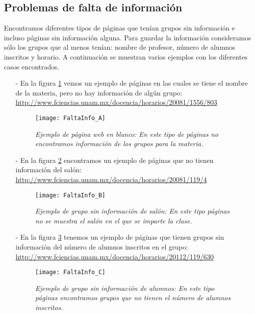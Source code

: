 \subsection{Problemas de falta de información}

Encontramos diferentes tipos de páginas que tenían grupos sin información e incluso páginas sin información alguna. Para guardar la información consideramos sólo los grupos que al menos tenían: nombre de profesor, número de alumnos inscritos y horario. A continuación se muestran varios ejemplos con los diferentes casos encontrados. %


\begin{itemize}
\item[-] En la figura \ref{pagEnBlanco} vemos un ejemplo de páginas en las cuales se tiene el nombre de la materia, pero no hay información de algún grupo: \url{http://www.fciencias.unam.mx/docencia/horarios/20081/1556/803}

\begin{figure}[H]
\centering
\texttt{[image: FaltaInfo\_A]} %
\caption[\textit{Ejemplo de página web en blanco}]{\textit{Ejemplo de página web en blanco: En este tipo de páginas no encontramos información de los grupos para la materia.}}\label{pagEnBlanco}
\end{figure}

\item[-] En la figura \ref{GpoSinInfo} encontramos un ejemplo de páginas que no tienen información del salón: \url{http://www.fciencias.unam.mx/docencia/horarios/20081/119/4}

\begin{figure}[H]
\centering
\texttt{[image: FaltaInfo\_B]} %
\caption[\textit{Ejemplo de grupo sin información de salón}]{\textit{Ejemplo de grupo sin información de salón: En este tipo páginas no se muestra el salón en el que se imparte la clase.}}\label{GpoSinInfo}
\end{figure}

\item[-] En la figura \ref{GpoSinAlumnos} tenemos un ejemplo de páginas que tienen grupos sin información del número de alumnos inscritos en el grupo: \url{http://www.fciencias.unam.mx/docencia/horarios/20112/119/630}

\begin{figure}[H]
\centering
\texttt{[image: FaltaInfo\_C]} %
\caption[\textit{Ejemplo de grupo sin información de alumnos}]{\textit{Ejemplo de grupo sin información de alumnos: En este tipo páginas encontramos grupos que no tienen el número de alumnos inscritos.}}\label{GpoSinAlumnos}
\end{figure}


\end{itemize}
